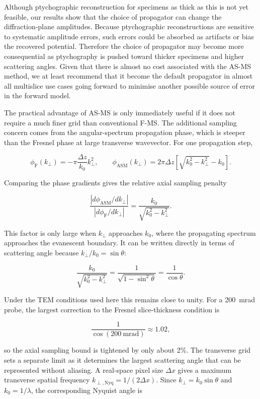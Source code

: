 \documentclass[preprint,12pt,number]{elsarticle}
\begin{document}
Although ptychographic reconstruction for specimens as thick as this is not yet feasible,
our results show that the choice of propagator can change the diffraction-plane
amplitudes. Because ptychographic
reconstructions are sensitive to systematic amplitude errors, such errors could
be absorbed as artifacts or bias the recovered potential. Therefore the
choice of propagator may become more consequential as ptychography is
pushed toward thicker specimens and higher scattering angles. Given that there 
is almost no cost associated with the AS-MS method, we at least recommend that it become the 
default propagator in almost all multislice use cases going forward to minimise 
another possible source of error in the forward model. 

The practical advantage of AS-MS is only immediately useful if it does not require a much
finer grid than conventional F-MS. The additional sampling concern comes
from the angular-spectrum propagation phase, which is steeper than the Fresnel
phase at large transverse wavevector. For one propagation step,

\[
\phi_{\mathrm{F}}(k_\perp) = -\pi\frac{\Delta z}{k_0}k_\perp^2,
\qquad
\phi_{\mathrm{ASM}}(k_\perp) =
2\pi\Delta z\left[\sqrt{k_0^2-k_\perp^2}-k_0\right].
\]

Comparing the phase gradients gives the relative axial sampling penalty

\[
\frac{\left|d\phi_{\mathrm{ASM}}/dk_\perp\right|}
{\left|d\phi_{\mathrm{F}}/dk_\perp\right|}
=
\frac{k_0}{\sqrt{k_0^2-k_\perp^2}}.
\]

This factor is only large when $k_\perp$ approaches $k_0$, where the
propagating spectrum approaches the evanescent boundary. It can be written
directly in terms of scattering angle because $k_\perp/k_0=\sin\theta$:

\[
\frac{k_0}{\sqrt{k_0^2-k_\perp^2}}
= \frac{1}{\sqrt{1-\sin^2\theta}}
= \frac{1}{\cos\theta}.
\]

Under the TEM conditions used here this remains close to unity. For a
200~mrad probe, the largest correction to the Fresnel slice-thickness
condition is

\[
\frac{1}{\cos(200~\mathrm{mrad})}
\approx 1.02,
\]

so the axial sampling bound is tightened by only about 2\%. The transverse grid sets a separate 
limit as it determines the largest
scattering angle that can be represented without aliasing. A real-space pixel
size $\Delta x$ gives a maximum transverse spatial frequency
$k_{\perp,\mathrm{Nyq}}=1/(2\Delta x)$. Since
$k_\perp=k_0\sin\theta$ and $k_0=1/\lambda$, the corresponding Nyquist
angle is
\end{document}
